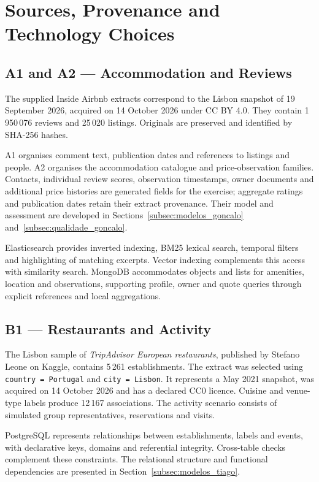 \section{Sources, Provenance and Technology Choices}
\label{sec:fontes}
\subsection{A1 and A2 --- Accommodation and Reviews}
The supplied Inside Airbnb extracts\cite{insideairbnb} correspond to the Lisbon snapshot of 19 September 2026, acquired on 14 October 2026 under CC BY 4.0. They contain 1\,950\,076 reviews and 25\,020 listings. Originals are preserved and identified by SHA-256 hashes.

A1 organises comment text, publication dates and references to listings and people. A2 organises the accommodation catalogue and price-observation families. Contacts, individual review scores, observation timestamps, owner documents and additional price histories are generated fields for the exercise; aggregate ratings and publication dates retain their extract provenance. Their model and assessment are developed in Sections~\ref{subsec:modelos_goncalo} and~\ref{subsec:qualidade_goncalo}.

Elasticsearch provides inverted indexing, BM25 lexical search, temporal filters and highlighting of matching excerpts. Vector indexing complements this access with similarity search. MongoDB accommodates objects and lists for amenities, location and observations, supporting profile, owner and quote queries through explicit references and local aggregations.

\subsection{B1 --- Restaurants and Activity}
The Lisbon sample of \emph{TripAdvisor European restaurants}, published by Stefano Leone on Kaggle\cite{tripadvisorkaggle}, contains 5\,261 establishments. The extract was selected using \texttt{country = Portugal} and \texttt{city = Lisbon}. It represents a May 2021 snapshot, was acquired on 14 October 2026 and has a declared CC0 licence. Cuisine and venue-type labels produce 12\,167 associations. The activity scenario consists of simulated group representatives, reservations and visits.

PostgreSQL represents relationships between establishments, labels and events, with declarative keys, domains and referential integrity. Cross-table checks complement these constraints. The relational structure and functional dependencies are presented in Section~\ref{subsec:modelos_tiago}.

